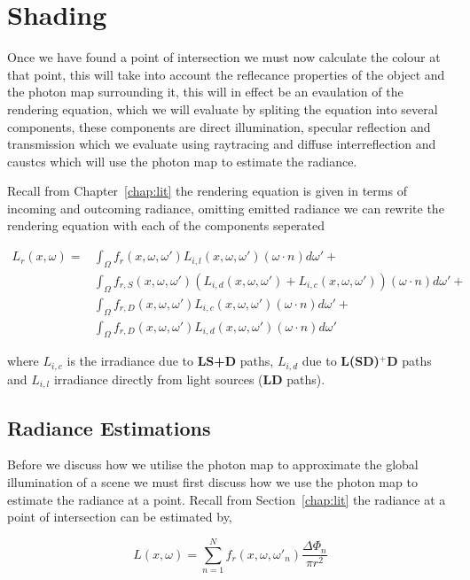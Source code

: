 \section{Shading}
Once we have found a point of intersection we must now calculate the colour at that point, this will take into account the
reflecance properties of the object and the photon map surrounding it, this will in effect be an evaulation of the rendering
equation, which we will evaluate by spliting the equation into several components, these components are direct illumination,
specular reflection and transmission which we evaluate using raytracing and diffuse interreflection and caustcs which will
use the photon map to estimate the radiance.

Recall from Chapter~\ref{chap:lit}  the rendering equation is given in terms of incoming and outcoming radiance, omitting
emitted radiance we can rewrite the rendering equation with each of the components seperated \cite{JensenBook}

\begin{align*}
L_{r}(x, \omega) =&
			\int_{\Omega}
				f_{r}(x, \omega, \omega')
				L_{i,l}(x,\omega,\omega')
				(\omega \cdot n)d\omega'
			+\\
		&	\int_{\Omega}
				f_{r,S}(x, \omega, \omega')
				(
				L_{i,d}(x,\omega,\omega')
				+
				L_{i,c}(x,\omega,\omega')
				)
				(\omega \cdot n)d\omega'
			+\\
		&	\int_{\Omega}
				f_{r,D}(x, \omega, \omega')
				L_{i,c}(x,\omega,\omega')
				(\omega \cdot n)d\omega'
			+\\
		&	\int_{\Omega}
				f_{r,D}(x, \omega, \omega')
				L_{i,d}(x,\omega,\omega')
				(\omega \cdot n)d\omega'
\end{align*}

where $L_{i,c}$ is the irradiance due to \textbf{LS+D} paths, $L_{i,d}$ due to \textbf{L(S\textbar D)$^+$D} paths and $L_{i,l}$
irradiance directly from light sources (\textbf{LD} paths).

\subsection{Radiance Estimations}
Before we discuss how we utilise the photon map to approximate the global illumination of a scene we must first discuss how
we use the photon map to estimate the radiance at a point. Recall from Section~\ref{chap:lit} the radiance at a point
of intersection can be estimated by,

\begin{equation}
L(x, \omega) = \sum\limits_{n = 1}^N f_r(x,\omega,\omega'_n) \frac{\Delta\Phi_n}{\pi r ^ 2}
\end{equation}

